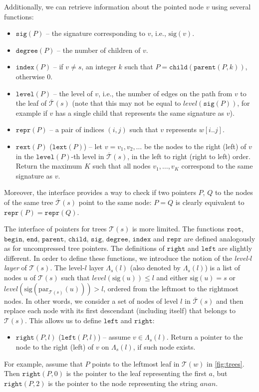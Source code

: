 \documentclass[a4paper]{article}
\theoremstyle{remark}
\newcommand{\str}{w}
\newcommand{\slev}{\textit{level}}
\newcommand{\stree}{\mathcal{T}}
\newcommand{\ustree}{\mathcal{\overline{T}}}
\newcommand{\spar}[1]{\mathrm{par}_{\stree(#1)}}
\newcommand{\ussig}{\mathrm{sig}}
\newcommand{\stlayer}{\Lambda}
\newcommand{\itroot}{\mathtt{root}}
\newcommand{\itbegin}{\mathtt{begin}}
\newcommand{\itend}{\mathtt{end}}
\newcommand{\itparent}{\mathtt{parent}}
\newcommand{\itchild}{\mathtt{child}}
\newcommand{\itindex}{\mathtt{index}}
\newcommand{\itlevel}{\mathtt{level}}
\newcommand{\itleft}{\mathtt{left}}
\newcommand{\itrepr}{\mathtt{repr}}
\newcommand{\itright}{\mathtt{right}}
\newcommand{\itdegree}{\mathtt{degree}}
\newcommand{\itsig}{\mathtt{sig}}
\newcommand{\itrext}{\mathtt{rext}}
\newcommand{\itlext}{\mathtt{lext}}
\begin{document}
Additionally, we can retrieve information about the pointed node $v$ using several functions:
\begin{itemize}
  \item $\itsig(P)$ -- the signature corresponding to $v$, i.e., $\ussig(v)$.
  \item $\itdegree(P)$ -- the number of children of $v$.
  \item $\itindex(P)$ -- if $v \neq s$, an integer $k$ such that $P=\itchild(\itparent(P,k))$, otherwise $0$.
  \item $\itlevel(P)$ -- the level of $v$, i.e., the number of edges on the path from $v$ to the leaf of $\ustree(s)$ (note that this may not be equal to $\slev(\itsig(P))$, for example if $v$ has a single child that represents the same signature as $v$).
  \item $\itrepr(P)$ -- a pair of indices $(i,j)$ such that $v$ represents $w[i..j]$.
  \item $\itrext(P)$ ($\itlext(P)$) -- let $v=v_1,v_2,\ldots$ be the nodes to the right (left) of $v$
    in the $\itlevel(P)$-th level in $\ustree(s)$, in the left to right (right to left) order.
    Return the maximum $K$ such that
    all nodes $v_1,\ldots,v_K$ correspond to the same signature as $v$.
\end{itemize}

Moreover, the interface provides a way to check if two pointers $P$, $Q$ to
the nodes of the same tree $\ustree(s)$ point to the same node:
$P=Q$ is clearly equivalent to $\itrepr(P)=\itrepr(Q)$.

The interface of pointers for trees $\stree(s)$ is more limited.
The functions $\itroot$, $\itbegin$, $\itend$, $\itparent$, $\itchild$,
$\itsig$, $\itdegree$, $\itindex$ and $\itrepr$ are defined
analogously as for uncompressed tree pointers.
The definitions of $\itright$ and $\itleft$ are slightly different.
In order to define these functions, we introduce the notion of
the \emph{level-$l$ layer} of $\stree(s)$.
The level-$l$ layer $\stlayer_s(l)$ (also denoted by $\stlayer_s(l)$)
is a list of nodes $u$ of $\stree(s)$ such that $\slev(\ussig(u))\leq l$
and either $\ussig(u)=s$ or $\slev(\ussig(\spar{s}(u)))>l$, ordered from the leftmost to the rightmost nodes.
In other words, we consider a set of nodes of level $l$ in $\ustree(s)$ and then replace each node with its first descendant (including itself) that belongs to $\stree(s)$.
This allows us to define $\itleft$ and $\itright$:
\begin{itemize}
  \item $\itright(P,l)$ ($\itleft(P,l)$) -- assume $v\in \stlayer_s(l)$.
    Return a pointer to the node to the right (left) of $v$ on $\stlayer_s(l)$, if such node exists.
\end{itemize}
For example, assume that $P$ points to the leftmost leaf in $\stree(\str)$ in \cref{fig:trees}.
Then $\itright(P, 0)$ is the pointer to the leaf representing the first $a$, but $\itright(P, 2)$ is the pointer to the node representing the string $anan$.
\end{document}
